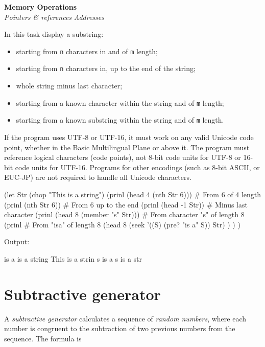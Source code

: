 \textbf{Memory Operations} \\
\emph{Pointers \& references}
\textbar{} \emph{Addresses}

In this task display a substring:

\begin{itemize}
\item
  starting from \texttt{n} characters in and of \texttt{m} length;
\item
  starting from \texttt{n} characters in, up to the end of the string;
\item
  whole string minus last character;
\item
  starting from a known character within the string and of \texttt{m}
  length;
\item
  starting from a known substring within the string and of \texttt{m}
  length.
\end{itemize}

If the program uses UTF-8 or UTF-16, it must work on any valid Unicode
code point, whether in the Basic Multilingual Plane or above it. The
program must reference logical characters (code points), not 8-bit code
units for UTF-8 or 16-bit code units for UTF-16. Programs for other
encodings (such as 8-bit ASCII, or EUC-JP) are not required to handle
all Unicode characters.


\begin{wideverbatim}

(let Str (chop "This is a string")
   (prinl (head 4 (nth Str 6)))        # From 6 of 4 length
   (prinl (nth Str 6))                 # From 6 up to the end
   (prinl (head -1 Str))               # Minus last character
   (prinl (head 8 (member "s" Str)))   # From character "s" of length 8
   (prinl                              # From "isa" of length 8
      (head 8
         (seek '((S) (pre? "is a" S)) Str) ) ) )

Output:

is a
is a string
This is a strin
s is a s
is a str

\end{wideverbatim}

\pagebreak{}
\section*{Subtractive generator}

A \emph{subtractive generator} calculates a sequence of \emph{random
  numbers}, where each number is congruent to the subtraction of two
previous numbers from the sequence. The formula is


